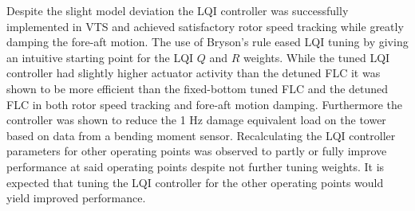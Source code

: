 \smallskip
Despite the slight model deviation the LQI controller was successfully implemented in VTS and achieved satisfactory rotor speed tracking while greatly damping the fore-aft motion. The use of Bryson's rule eased LQI tuning by giving an intuitive starting point for the LQI $ Q $ and $ R $ weights. While the tuned LQI controller had slightly higher actuator activity than the detuned FLC it was shown to be more efficient than the fixed-bottom tuned FLC and the detuned FLC in both rotor speed tracking and fore-aft motion damping. Furthermore the controller was shown to reduce the 1 Hz damage equivalent load on the tower based on data from a bending moment sensor. Recalculating the LQI controller parameters for other operating points was observed to partly or fully improve performance at said operating points despite not further tuning weights. It is expected that tuning the LQI controller for the other operating points would yield improved performance.











